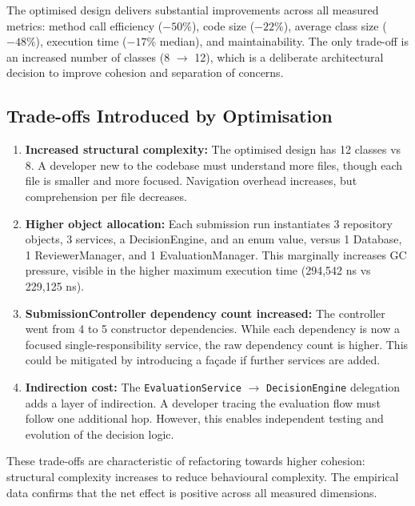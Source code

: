 \documentclass[12pt, a4paper]{article}
\begin{document}
The optimised design delivers substantial improvements across all measured metrics: method call efficiency ($-50\%$), code size ($-22\%$), average class size ($-48\%$), execution time ($-17\%$ median), and maintainability. The only trade-off is an increased number of classes (8 $\rightarrow$ 12), which is a deliberate architectural decision to improve cohesion and separation of concerns.

\subsection{Trade-offs Introduced by Optimisation}

\begin{enumerate}
    \item \textbf{Increased structural complexity:} The optimised design has 12 classes vs 8. A developer new to the codebase must understand more files, though each file is smaller and more focused. Navigation overhead increases, but comprehension per file decreases.

    \item \textbf{Higher object allocation:} Each submission run instantiates 3 repository objects, 3 services, a DecisionEngine, and an enum value, versus 1 Database, 1 ReviewerManager, and 1 EvaluationManager. This marginally increases GC pressure, visible in the higher maximum execution time (294{,}542 ns vs 229{,}125 ns).

    \item \textbf{SubmissionController dependency count increased:} The controller went from 4 to 5 constructor dependencies. While each dependency is now a focused single-responsibility service, the raw dependency count is higher. This could be mitigated by introducing a fa\c{c}ade if further services are added.

    \item \textbf{Indirection cost:} The \texttt{EvaluationService} $\rightarrow$ \texttt{DecisionEngine} delegation adds a layer of indirection. A developer tracing the evaluation flow must follow one additional hop. However, this enables independent testing and evolution of the decision logic.
\end{enumerate}

These trade-offs are characteristic of refactoring towards higher cohesion: structural complexity increases to reduce behavioural complexity. The empirical data confirms that the net effect is positive across all measured dimensions.
\end{document}
